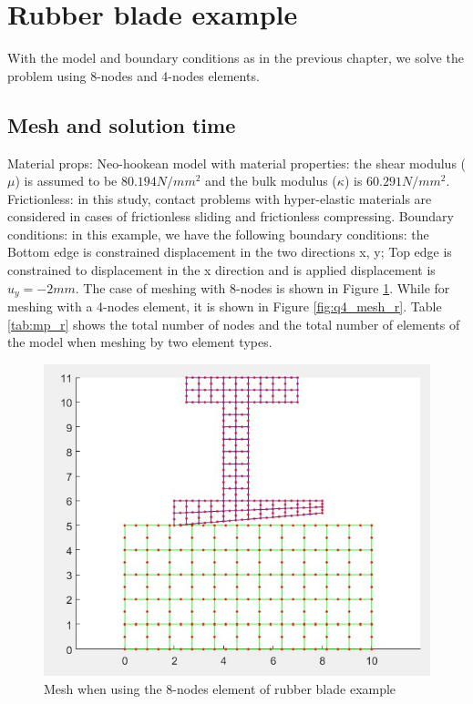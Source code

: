 \section{Rubber blade example}
With the model and boundary conditions as in the previous chapter, we solve the problem using 8-nodes and 4-nodes elements.
\subsection{Mesh and solution time}
Material props: Neo-hookean model with material properties: the shear modulus ($\mu$) is assumed to be $80.194 N/mm^2$ and the bulk modulus ($\kappa$) is $60.291 N/mm^2$.
\vspace{0.38cm} \newline
Frictionless: in this study, contact problems with hyper-elastic materials are
considered in cases of frictionless sliding and frictionless compressing.
\vspace{0.38cm} \newline
Boundary conditions: in this example, we have the following boundary conditions: the Bottom edge is 
constrained displacement in the two directions x, y; Top edge is constrained to displacement in the 
x direction and is applied displacement is $u_y = - 2 mm$.
\vspace{0.38cm}
\newline
The case of meshing with 8-nodes is shown in Figure \ref{fig:q8_mesh_r}.
While for meshing with a 4-nodes element, it is shown in Figure \ref{fig:q4_mesh_r}.
Table \ref{tab:mp_r} shows the total number of nodes and the total number of elements of the model when meshing by two element types.
\vspace{0.01cm}
\newline
\begin{figure}[H]
    \centering
    \includegraphics[scale=0.875]{Figures/chapter5/q8_mesh_r.jpg}
    \decoRule
    \caption{Mesh when using the 8-nodes element of rubber blade example}
    \label{fig:q8_mesh_r}
\end{figure}
